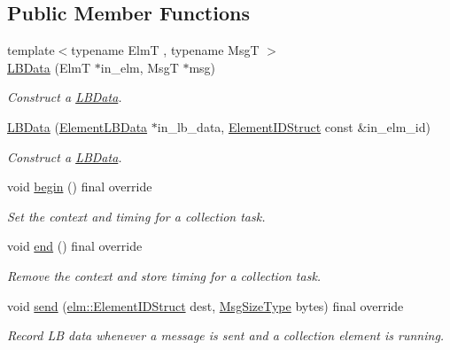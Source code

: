 \subsection*{Public Member Functions}
\begin{DoxyCompactItemize}
\item 
{\footnotesize template$<$typename ElmT , typename MsgT $>$ }\\\hyperlink{structvt_1_1ctx_1_1_l_b_data_aeee7259db248f19afcc19179c1a623ba}{L\+B\+Data} (ElmT $\ast$in\+\_\+elm, MsgT $\ast$msg)
\begin{DoxyCompactList}\small\item\em Construct a {\ttfamily \hyperlink{structvt_1_1ctx_1_1_l_b_data}{L\+B\+Data}}. \end{DoxyCompactList}\item 
\hyperlink{structvt_1_1ctx_1_1_l_b_data_ac049bfde4cc4820b5e065e1626284b09}{L\+B\+Data} (\hyperlink{structvt_1_1ctx_1_1_l_b_data_a11f1aeb75c01ae0c77d96f94ce1994bb}{Element\+L\+B\+Data} $\ast$in\+\_\+lb\+\_\+data, \hyperlink{structvt_1_1ctx_1_1_l_b_data_aad9fac05c3faf80173b273d900db6fb1}{Element\+I\+D\+Struct} const \&in\+\_\+elm\+\_\+id)
\begin{DoxyCompactList}\small\item\em Construct a {\ttfamily \hyperlink{structvt_1_1ctx_1_1_l_b_data}{L\+B\+Data}}. \end{DoxyCompactList}\item 
void \hyperlink{structvt_1_1ctx_1_1_l_b_data_adf2e7f7e42dae24eb1cc9dca14f4a8a6}{begin} () final override
\begin{DoxyCompactList}\small\item\em Set the context and timing for a collection task. \end{DoxyCompactList}\item 
void \hyperlink{structvt_1_1ctx_1_1_l_b_data_a1a3b7728a5b9948183136c1ccec42d41}{end} () final override
\begin{DoxyCompactList}\small\item\em Remove the context and store timing for a collection task. \end{DoxyCompactList}\item 
void \hyperlink{structvt_1_1ctx_1_1_l_b_data_ad99695a670b4e486603ff852785f611a}{send} (\hyperlink{structvt_1_1elm_1_1_element_i_d_struct}{elm\+::\+Element\+I\+D\+Struct} dest, \hyperlink{namespacevt_a408e86a8c7c89309b52907dc5a513924}{Msg\+Size\+Type} bytes) final override
\begin{DoxyCompactList}\small\item\em Record LB data whenever a message is sent and a collection element is running. \end{DoxyCompactList}\item 

\end{DoxyCompactItemize}
